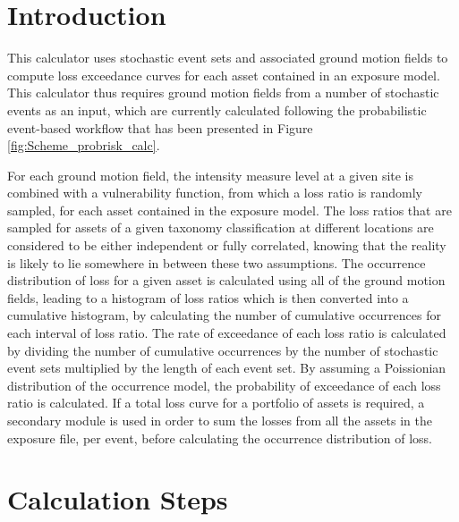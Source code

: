 \section{Introduction}
This calculator uses stochastic event sets and associated ground motion fields to compute loss exceedance curves for each asset contained in an exposure model. This calculator thus requires ground motion fields from a number of stochastic events as an input, which are currently calculated following the probabilistic event-based workflow that has been presented in Figure \ref{fig:Scheme_probrisk_calc}.

For each ground motion field, the intensity measure level at a given site is combined with a vulnerability function, from which a loss ratio is randomly sampled, for each asset contained in the exposure model. The loss ratios that are sampled for assets of a given taxonomy classification at different locations are considered to be either independent or fully correlated, knowing that the reality is likely to lie somewhere in between these two assumptions. The occurrence distribution of loss for a given asset is calculated using all of the ground motion fields, leading to a histogram of loss ratios which is then converted into a cumulative histogram, by calculating the number of cumulative occurrences for each interval of loss ratio. The rate of exceedance of each loss ratio is calculated by dividing the number of cumulative occurrences by the number of stochastic event sets multiplied by the length of each event set. By assuming a Poissionian distribution of the occurrence model, the probability of exceedance of each loss ratio is calculated. If a total loss curve for a portfolio of assets is required, a secondary module is used in order to sum the losses from all the assets in the exposure file, per event, before calculating the occurrence distribution of loss. 

\section{Calculation Steps}

